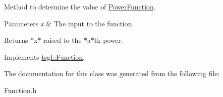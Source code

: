 \-Method to determine the value of \hyperlink{classtsgl_1_1_power_function}{\-Power\-Function}. 


\begin{DoxyParams}{\-Parameters}
{\em x} & \-The input to the function. \\
\hline
\end{DoxyParams}
\begin{DoxyReturn}{\-Returns}
$\ast$x$\ast$ raised to the $\ast$a$\ast$th power. 
\end{DoxyReturn}


\-Implements \hyperlink{classtsgl_1_1_function_affb7b3b19a04efefa29a9870d666e912}{tsgl\-::\-Function}.



\-The documentation for this class was generated from the following file\-:\begin{DoxyCompactItemize}
\item 
\-Function.\-h\end{DoxyCompactItemize}
